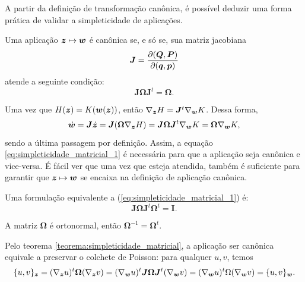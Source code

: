 A partir da definição de transformação canônica, é possível deduzir uma forma prática de validar a simpleticidade de aplicações.

\begin{theorem}\label{teorema:simpleticidade_matricial}
    Uma aplicação $\bm z \mapsto \bm w$ é canônica se, e só se, sua matriz jacobiana
    \begin{equation*}
        \bm J = \dfrac{\partial (\bm Q, \bm P)}{\partial (\bm q, \bm p)}
    \end{equation*}
    atende a seguinte condição:
    \begin{equation}\label{eq:simpleticidade_matricial_1}
        \bm J \bm \Omega \bm J^t = \bm \Omega.
    \end{equation}
\end{theorem}
\begin{Proof}
    Uma vez que $H(\bm z) = K(\bm w(\bm z))$, então $\nabla_{\bm z} H = \bm J^t \nabla_{\bm w} K$. Dessa forma,
    \begin{equation*}
        \dot {\bm w} 
        = \bm J \dot {\bm z} 
        = \bm J (\bm \Omega \nabla_{\bm z} H)
        = \bm J \bm \Omega \bm J^t \nabla_{\bm w} K
        = \bm \Omega \nabla_{\bm w} K,
    \end{equation*}
    sendo a última passagem por definição. Assim, a equação \ref{eq:simpleticidade_matricial_1} é necessária para que a aplicação seja canônica e vice-versa. É fácil ver que uma vez que esteja atendida, também é suficiente para garantir que $\bm z \mapsto \bm w$ se encaixa na definição de aplicação canônica.
\end{Proof}

\begin{corollary}
    Uma formulação equivalente a (\ref{eq:simpleticidade_matricial_1}) é:
    \begin{equation}\label{eq:simpleticidade_matricial_2}
        \bm J \bm \Omega \bm J^t \bm \Omega^t = \bm I.
    \end{equation}
\end{corollary}
\begin{Proof}
    A matriz $\bm \Omega$ é ortonormal, então $\bm \Omega^{-1} = \bm \Omega^t$.
\end{Proof}

Pelo teorema \ref{teorema:simpleticidade_matricial}, a aplicação ser canônica equivale a preservar o colchete de Poisson: para qualquer $u, v$, temos
\begin{equation*}
    \{ u, v \}_{\bm z}
    = (\nabla_{\bm z} u)^t \bm \Omega (\nabla_{\bm z} v)
    = (\nabla_{\bm w} u)^t \bm J \bm \Omega \bm J^t (\nabla_{\bm w} v)
    = (\nabla_{\bm w} u)^t \Omega (\nabla_{\bm w} v)
    = \{u, v \}_{\bm w}.
\end{equation*}

